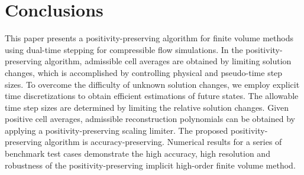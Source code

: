
\section{Conclusions}
\label{sec:Conclusions}

This paper presents a positivity-preserving algorithm for finite volume methods using dual-time stepping for compressible flow simulations.
In the positivity-preserving algorithm, admissible cell averages are obtained by limiting solution changes,
which is accomplished by controlling physical and pseudo-time step sizes.
To overcome the difficulty of unknown solution changes,
we employ explicit time discretizations to obtain efficient estimations of future states.
The allowable time step sizes are determined by limiting the relative solution changes.
Given positive cell averages,
admissible reconstruction polynomials can be obtained by applying a positivity-preserving scaling limiter.
The proposed positivity-preserving algorithm is accuracy-preserving.
Numerical results for a series of benchmark test cases demonstrate the high accuracy, high resolution and robustness of the positivity-preserving implicit high-order finite volume method.